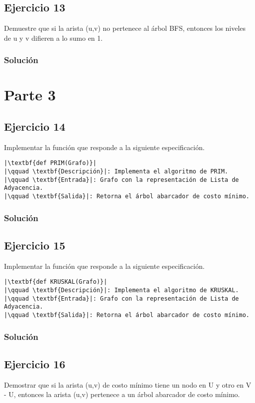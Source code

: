 \documentclass{article}
\begin{document}
\subsection*{Ejercicio 13}
Demuestre que si la arista (u,v) no pertenece al árbol BFS, entonces los niveles de u y v difieren a lo sumo en 1.
\subsubsection*{Solución}


\section*{Parte 3}
\subsection*{Ejercicio 14}
Implementar la función que responde a la siguiente especificación.
\begin{lstlisting}
|\textbf{def PRIM(Grafo)}|
|\qquad \textbf{Descripción}|: Implementa el algoritmo de PRIM.
|\qquad \textbf{Entrada}|: Grafo con la representación de Lista de Adyacencia.
|\qquad \textbf{Salida}|: Retorna el árbol abarcador de costo mínimo.
\end{lstlisting}
\subsubsection*{Solución}


\subsection*{Ejercicio 15}
Implementar la función que responde a la siguiente especificación.
\begin{lstlisting}
|\textbf{def KRUSKAL(Grafo)}|
|\qquad \textbf{Descripción}|: Implementa el algoritmo de KRUSKAL.
|\qquad \textbf{Entrada}|: Grafo con la representación de Lista de Adyacencia.
|\qquad \textbf{Salida}|: Retorna el árbol abarcador de costo mínimo.
\end{lstlisting}
\subsubsection*{Solución}


\subsection*{Ejercicio 16}
Demostrar que si la arista (u,v) de costo mínimo tiene un nodo en U y otro en V - U, entonces la arista (u,v) pertenece a un árbol abarcador de costo mínimo.
\end{document}
